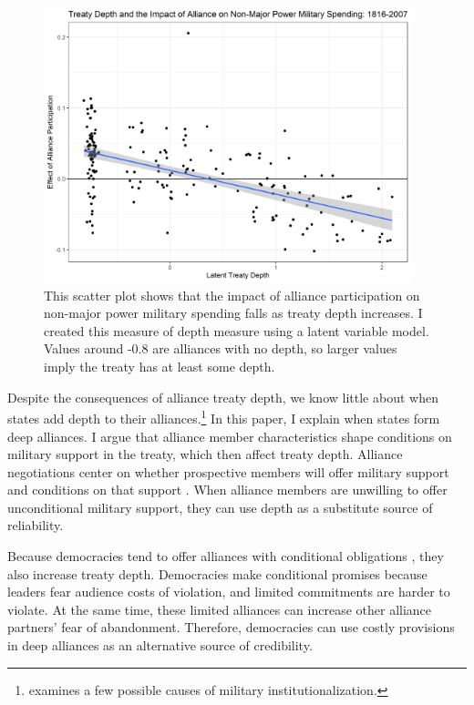\documentclass[12pt]{article}
\begin{document}
\begin{figure}[hbtp]
\centering
\includegraphics[width=0.95\textwidth]{../figures/depth-motive.png}
\caption{This scatter plot shows that the impact of alliance participation on non-major power military spending falls as treaty depth increases. I created this measure of depth measure using a latent variable model. Values around -0.8 are alliances with no depth, so larger values imply the treaty has at least some depth.}
\label{fig:depth-motive}
\end{figure}


Despite the consequences of alliance treaty depth, we know little about when states add depth to their alliances.\footnote{\citet{Mattes2012} examines a few possible causes of military institutionalization.}
In this paper, I explain when states form deep alliances.
I argue that alliance member characteristics shape conditions on military support in the treaty, which then affect treaty depth. 
Alliance negotiations center on whether prospective members will offer military support and conditions on that support \citep{Poast2019a}. 
When alliance members are unwilling to offer unconditional military support, they can use depth as a substitute source of reliability.%


Because democracies tend to offer alliances with conditional obligations \citep{Mattes2012, Chibaetal2015}, they also increase treaty depth. 
Democracies make conditional promises because leaders fear audience costs of violation, and limited commitments are harder to violate.
At the same time, these limited alliances can increase other alliance partners' fear of abandonment. 
Therefore, democracies can use costly provisions in deep alliances as an alternative source of credibility.   
\end{document}
